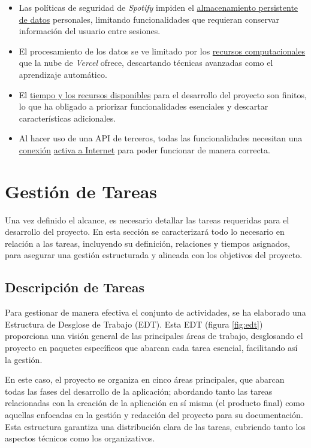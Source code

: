 \begin{itemize}
    \item Las políticas de seguridad de \textit{Spotify} impiden el \underline{almacenamiento persistente de datos} personales, limitando funcionalidades que requieran conservar información del usuario entre sesiones.

    \item El procesamiento de los datos se ve limitado por los \underline{recursos computacionales} que la nube de \textit{Vercel} ofrece, descartando técnicas avanzadas como el aprendizaje automático.

    \item El \underline{tiempo y los recursos disponibles} para el desarrollo del proyecto son finitos, lo que ha obligado a priorizar funcionalidades esenciales y descartar características adicionales.

    \item Al hacer uso de una API de terceros, todas las funcionalidades necesitan una \underline{conexión} \underline{activa a Internet} para poder funcionar de manera correcta.
\end{itemize}

\section{Gestión de Tareas}

Una vez definido el alcance, es necesario detallar las tareas requeridas para el desarrollo del proyecto. En esta sección se caracterizará todo lo necesario en relación a las tareas, incluyendo su definición, relaciones y tiempos asignados, para asegurar una gestión estructurada y alineada con los objetivos del proyecto.

\subsection{Descripción de Tareas}

Para gestionar de manera efectiva el conjunto de actividades, se ha elaborado una Estructura de Desglose de Trabajo (EDT). Esta EDT (figura \ref{fig:edt}) proporciona una visión general de las principales áreas de trabajo, desglosando el proyecto en paquetes específicos que abarcan cada tarea esencial, facilitando así la gestión.

En este caso, el proyecto se organiza en cinco áreas principales, que abarcan todas las fases del desarrollo de la aplicación; abordando tanto las tareas relacionadas con la creación de la aplicación en sí misma (el producto final) como aquellas enfocadas en la gestión y redacción del proyecto para su documentación. Esta estructura garantiza una distribución clara de las tareas, cubriendo tanto los aspectos técnicos como los organizativos.

